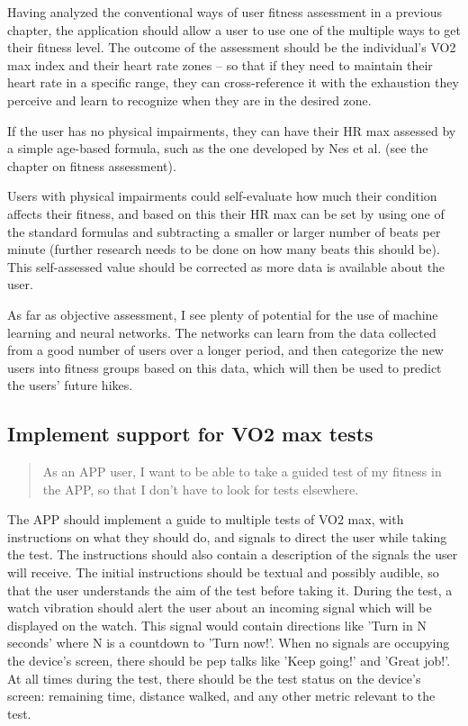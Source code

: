 Having analyzed the conventional ways of user fitness assessment in a previous chapter, the application should allow a user to use one of the multiple ways to get their fitness level.
The outcome of the assessment should be the individual's VO2 max index and their heart rate zones -- so that if they need to maintain their heart rate in a specific range, they can cross-reference it with the exhaustion they perceive and learn to recognize when they are in the desired zone.

If the user has no physical impairments, they can have their HR max assessed by a simple age-based formula, such as the one developed by Nes et al. (see the chapter on fitness assessment).

Users with physical impairments could self-evaluate how much their condition affects their fitness, and based on this their HR max can be set by using one of the standard formulas and subtracting a smaller or larger number of beats per minute (further research needs to be done on how many beats this should be).
This self-assessed value should be corrected as more data is available about the user.

As far as objective assessment, I see plenty of potential for the use of machine learning and neural networks.
The networks can learn from the data collected from a good number of users over a longer period, and then categorize the new users into fitness groups based on this data, which will then be used to predict the users' future hikes.

\subsection{Implement support for VO2 max tests}\label{US:fit-vo2max}
\begin{quote}
As an APP user, I want to be able to take a guided test of my fitness in the APP, so that I don't have to look for tests elsewhere.
\end{quote}

The APP should implement a guide to multiple tests of VO2 max, with instructions on what they should do, and signals to direct the user while taking the test.
The instructions should also contain a description of the signals the user will receive.
The initial instructions should be textual and possibly audible, so that the user understands the aim of the test before taking it.
During the test, a watch vibration should alert the user about an incoming signal which will be displayed on the watch.
This signal would contain directions like 'Turn in N seconds' where N is a countdown to 'Turn now!'.
When no signals are occupying the device's screen, there should be pep talks like 'Keep going!' and 'Great job!'.
At all times during the test, there should be the test status on the device's screen: remaining time, distance walked, and any other metric relevant to the test.

